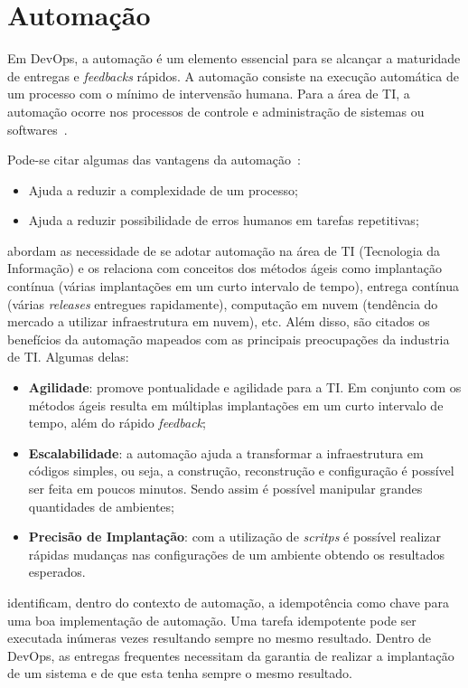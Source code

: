 \section{Automação}
\label{sec:auto}

Em DevOps, a automação é um elemento essencial para se alcançar a maturidade
de entregas e \textit{feedbacks} rápidos. A automação consiste na execução
automática de um processo com o mínimo de intervensão humana. Para a área
de TI, a automação ocorre nos processos de controle e administração de
sistemas ou softwares~\cite{sharma:2015}.

Pode-se citar algumas das vantagens da automação~\cite{sharma:2015}:
\begin{itemize}
  \item Ajuda a reduzir a complexidade de um processo;
  \item Ajuda a reduzir possibilidade de erros humanos em tarefas
    repetitivas;
\end{itemize}

 abordam as necessidade de se adotar automação na área
de TI (Tecnologia da Informação) e os relaciona com conceitos dos métodos ágeis como
implantação contínua (várias implantações em um curto intervalo de tempo), entrega contínua (várias
\textit{releases} entregues rapidamente), computação em nuvem (tendência do mercado a
utilizar infraestrutura em nuvem), etc. Além disso, são citados os benefícios da
automação mapeados com as principais preocupações da industria de TI. Algumas delas:

\begin{itemize}
  \item \textbf{Agilidade}: promove pontualidade e agilidade para a TI. Em conjunto
    com os métodos ágeis resulta em múltiplas implantações em um curto intervalo
    de tempo, além do rápido \textit{feedback};
  \item \textbf{Escalabilidade}: a automação ajuda a transformar a infraestrutura
    em códigos simples, ou seja, a construção, reconstrução e configuração é possível
    ser feita em poucos minutos. Sendo assim é possível manipular grandes quantidades
    de ambientes;
  \item \textbf{Precisão de Implantação}: com a utilização de \textit{scritps}
    é possível realizar rápidas mudanças nas configurações de um ambiente
    obtendo os resultados esperados.
\end{itemize}

 identificam, dentro do contexto de automação, a idempotência
como chave para uma boa implementação de automação. Uma tarefa idempotente pode ser
executada inúmeras vezes resultando sempre no mesmo resultado. Dentro de DevOps,
as entregas frequentes necessitam da garantia de realizar a implantação de um
sistema e de que esta tenha sempre o mesmo resultado.

